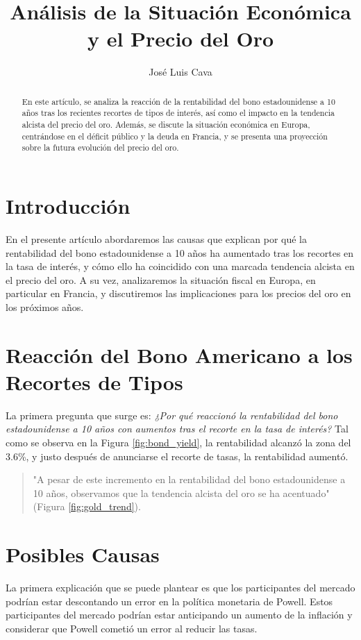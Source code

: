 \documentclass{article}
\title{Análisis de la Situación Económica y el Precio del Oro}
\author{José Luis Cava}
\date{}
\begin{document}
\maketitle

\begin{abstract}
En este artículo, se analiza la reacción de la rentabilidad del bono estadounidense a 10 años tras los recientes recortes de tipos de interés, así como el impacto en la tendencia alcista del precio del oro. Además, se discute la situación económica en Europa, centrándose en el déficit público y la deuda en Francia, y se presenta una proyección sobre la futura evolución del precio del oro.
\end{abstract}

\section{Introducción}
En el presente artículo abordaremos las causas que explican por qué la rentabilidad del bono estadounidense a 10 años ha aumentado tras los recortes en la tasa de interés, y cómo ello ha coincidido con una marcada tendencia alcista en el precio del oro. A su vez, analizaremos la situación fiscal en Europa, en particular en Francia, y discutiremos las implicaciones para los precios del oro en los próximos años.

\section{Reacción del Bono Americano a los Recortes de Tipos}
La primera pregunta que surge es: \emph{¿Por qué reaccionó la rentabilidad del bono estadounidense a 10 años con aumentos tras el recorte en la tasa de interés?} Tal como se observa en la Figura \ref{fig:bond_yield}, la rentabilidad alcanzó la zona del 3.6\%, y justo después de anunciarse el recorte de tasas, la rentabilidad aumentó.

\begin{quote}
"A pesar de este incremento en la rentabilidad del bono estadounidense a 10 años, observamos que la tendencia alcista del oro se ha acentuado" (Figura \ref{fig:gold_trend}).
\end{quote}

\section{Posibles Causas}
La primera explicación que se puede plantear es que los participantes del mercado podrían estar descontando un error en la política monetaria de Powell. Estos participantes del mercado podrían estar anticipando un aumento de la inflación y considerar que Powell cometió un error al reducir las tasas.
\end{document}
